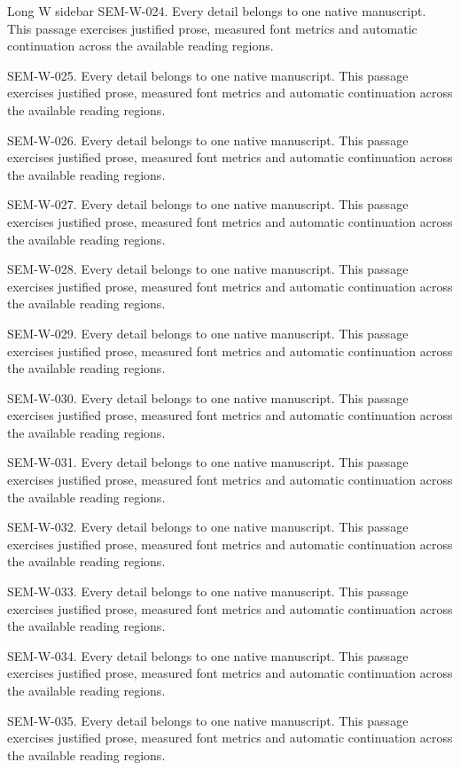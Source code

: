 \begin{m20sidebarwide}[columns=1,id=long-wide1]{Long W sidebar}
SEM-W-024. Every detail belongs to one native manuscript. This passage exercises justified prose, measured font metrics and automatic continuation across the available reading regions.\par
SEM-W-025. Every detail belongs to one native manuscript. This passage exercises justified prose, measured font metrics and automatic continuation across the available reading regions.\par
SEM-W-026. Every detail belongs to one native manuscript. This passage exercises justified prose, measured font metrics and automatic continuation across the available reading regions.\par
SEM-W-027. Every detail belongs to one native manuscript. This passage exercises justified prose, measured font metrics and automatic continuation across the available reading regions.\par
SEM-W-028. Every detail belongs to one native manuscript. This passage exercises justified prose, measured font metrics and automatic continuation across the available reading regions.\par
SEM-W-029. Every detail belongs to one native manuscript. This passage exercises justified prose, measured font metrics and automatic continuation across the available reading regions.\par
SEM-W-030. Every detail belongs to one native manuscript. This passage exercises justified prose, measured font metrics and automatic continuation across the available reading regions.\par
SEM-W-031. Every detail belongs to one native manuscript. This passage exercises justified prose, measured font metrics and automatic continuation across the available reading regions.\par
SEM-W-032. Every detail belongs to one native manuscript. This passage exercises justified prose, measured font metrics and automatic continuation across the available reading regions.\par
SEM-W-033. Every detail belongs to one native manuscript. This passage exercises justified prose, measured font metrics and automatic continuation across the available reading regions.\par
SEM-W-034. Every detail belongs to one native manuscript. This passage exercises justified prose, measured font metrics and automatic continuation across the available reading regions.\par
SEM-W-035. Every detail belongs to one native manuscript. This passage exercises justified prose, measured font metrics and automatic continuation across the available reading regions.\par

\end{m20sidebarwide}
